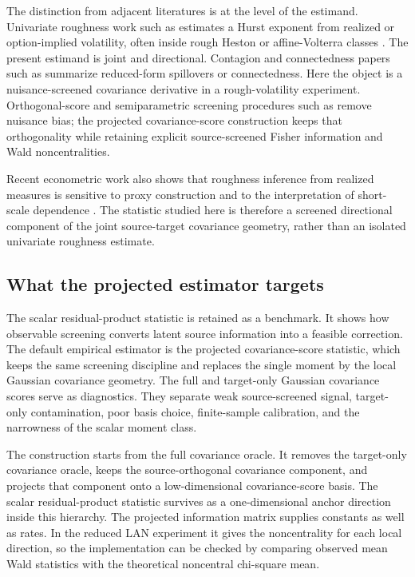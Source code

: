 \documentclass[11pt,a4paper]{amsart}
\theoremstyle{plain}
\theoremstyle{definition}
\theoremstyle{remark}
\begin{document}
The distinction from adjacent literatures is at the level of the estimand.  Univariate roughness
work such as \cite{gatheral2018volatility,bayer2016pricing} estimates a Hurst exponent from
realized or option-implied volatility, often inside rough Heston or affine-Volterra classes
\cite{eleuch2019roughheston,abijaber2019affine}.  The present estimand is joint and directional.
Contagion and connectedness papers such as
\cite{diebold2009spillovers,diebold2012better,diebold2014connectedness,barunik2018frequency}
summarize reduced-form spillovers or connectedness.  Here the object is a nuisance-screened
covariance derivative in a rough-volatility experiment.  Orthogonal-score and semiparametric
screening procedures such as \cite{newey1994semiparametric,chernozhukov2018dml} remove nuisance
bias; the projected covariance-score construction keeps that orthogonality while retaining explicit
source-screened Fisher information and Wald noncentralities.

Recent econometric work also shows that roughness inference from realized measures is sensitive to
proxy construction and to the interpretation of short-scale dependence \cite{cont2023artefact}.
The statistic studied here is therefore a screened directional component of the joint source-target
covariance geometry, rather than an isolated univariate roughness estimate.

\subsection*{What the projected estimator targets}

The scalar residual-product statistic is retained as a benchmark.  It shows how observable
screening converts latent source information into a feasible correction.  The default empirical
estimator is the projected covariance-score statistic, which keeps the same screening discipline and
replaces the single moment by the local Gaussian covariance geometry.  The full and target-only
Gaussian covariance scores serve as diagnostics.  They separate weak source-screened signal,
target-only contamination, poor basis choice, finite-sample calibration, and the narrowness of the
scalar moment class.

The construction starts from the full covariance oracle.  It removes the target-only covariance
oracle, keeps the source-orthogonal covariance component, and projects that component onto a
low-dimensional covariance-score basis.  The scalar residual-product statistic survives as a
one-dimensional anchor direction inside this hierarchy.  The projected information matrix supplies
constants as well as rates.  In the reduced LAN experiment it gives the noncentrality for each local
direction, so the implementation can be checked by comparing observed mean Wald statistics with the
theoretical noncentral chi-square mean.
\end{document}
